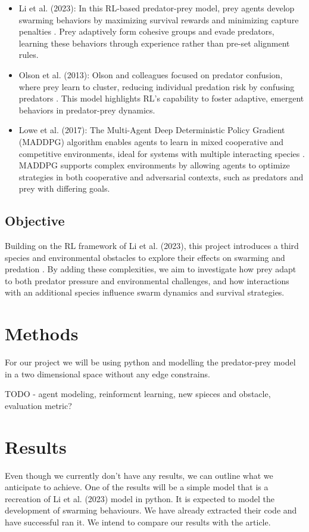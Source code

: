 \documentclass[9pt]{pnas-new}
\begin{document}
\begin{itemize}
    \item Li et al. (2023): In this RL-based predator-prey model, prey agents develop swarming behaviors by maximizing survival rewards and minimizing capture penalties \cite{}. Prey adaptively form cohesive groups and evade predators, learning these behaviors through experience rather than pre-set alignment rules.

    \item Olson et al. (2013): Olson and colleagues focused on predator confusion, where prey learn to cluster, reducing individual predation risk by confusing predators \cite{}. This model highlights RL’s capability to foster adaptive, emergent behaviors in predator-prey dynamics.

    \item Lowe et al. (2017): The Multi-Agent Deep Deterministic Policy Gradient (MADDPG) algorithm enables agents to learn in mixed cooperative and competitive environments, ideal for systems with multiple interacting species \cite{}. MADDPG supports complex environments by allowing agents to optimize strategies in both cooperative and adversarial contexts, such as predators and prey with differing goals.
\end{itemize}

\subsection{Objective}

Building on the RL framework of Li et al. (2023), this project introduces a third species and environmental obstacles to explore their effects on swarming and predation \cite{}. By adding these complexities, we aim to investigate how prey adapt to both predator pressure and environmental challenges, and how interactions with an additional species influence swarm dynamics and survival strategies.



\section*{Methods}

For our project we will be using python and modelling the predator-prey model in a two dimensional space without any edge constrains. 

TODO - 
agent modeling, reinformcnt learning, new spieces and obstacle, evaluation metric?


\section*{Results}
Even though we currently don't have any results, we can outline what we anticipate to achieve. One of the results will be a simple model that is a recreation of Li et al. (2023) model in python. It is expected to model the development of swarming behaviours.  We have already extracted their code and have successful ran it. We intend to compare our results with the article.
\end{document}
